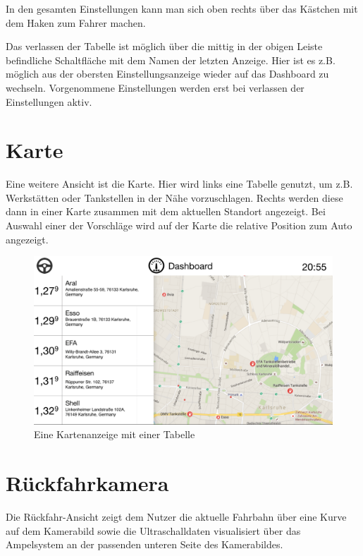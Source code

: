 \documentclass[pflichtenheft.tex]{subfiles}
\begin{document}
In den gesamten Einstellungen kann man sich oben rechts über das Kästchen mit dem Haken zum Fahrer machen.

Das verlassen der Tabelle ist möglich über die mittig in der obigen Leiste befindliche Schaltfläche mit dem Namen der letzten Anzeige. Hier ist es z.B. möglich aus der obersten Einstellungsanzeige wieder auf das Dashboard zu wechseln. Vorgenommene Einstellungen werden erst bei verlassen der Einstellungen aktiv.  


\clearpage
\section{Karte}
\label{sec:Karte}

Eine weitere Ansicht ist die Karte. Hier wird links eine Tabelle genutzt, um z.B. Werkstätten oder Tankstellen in der Nähe vorzuschlagen. Rechts werden diese dann in einer Karte zusammen mit dem aktuellen Standort angezeigt.
Bei Auswahl einer der Vorschläge wird auf der Karte die relative Position zum Auto angezeigt.
\begin{figure}[H]
  	\begin{center}
 		\includegraphics[width=\textwidth]{Images/GUI-Map.png}
  		\caption{Eine Kartenanzeige mit einer Tabelle}
  	\end{center}
\end{figure}

\clearpage
\section{Rückfahrkamera}

Die Rückfahr-Ansicht zeigt dem Nutzer die aktuelle Fahrbahn über eine Kurve auf dem Kamerabild sowie die Ultraschalldaten visualisiert über das Ampelsystem an der passenden unteren Seite des Kamerabildes.
\end{document}
